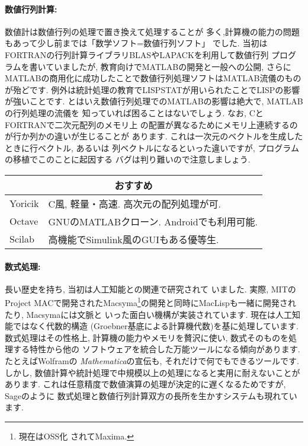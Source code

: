 \documentclass[b5j,8pt,twocolumn]{ltjsarticle}
\begin{document}
\paragraph{数値行列計算:} 数値計は数値行列の処理で置き換えて処理することが
多く,計算機の能力の問題もあって少し前までは「数学ソフト=数値行列ソフト」
でした. 当初はFORTRANの行列計算ライブラリBLASやLAPACKを利用して数値行列
プログラムを書いていましたが, 教育向けでMATLABの開発と一般への公開, さらに
MATLABの商用化に成功したことで数値行列処理ソフトはMATLAB流儀のものが殆どです.
 例外は統計処理の教育でLISPSTATが用いられたことでLISPの影響が強いことです.
 とはいえ数値行列処理でのMATLABの影響は絶大で, MATLABの行列処理の流儀を
知っていれば困ることはないでしょう. なお, CとFORTRANで二次元配列のメモリ上
の配置が異なるためにメモリ上連続するのが行か列かの違いが生じることが
あります. これは一次元のベクトルを生成したときに行ベクトル, あるいは
列ベクトルになるといった違いですが, プログラムの移植でこのことに起因する
バグは判り難いので注意しましょう.

\vspace{0.5cm}
{\footnotesize
\begin{tabularx}{7cm}{l X}
\multicolumn{2}{c}{おすすめ}\\\hline
Yoricik& C風, 軽量・高速. 高次元の配列処理が可.\\
Octave& GNUのMATLABクローン. Androidでも利用可能.\\
Scilab& 高機能でSimulink風のGUIもある優等生.\\\hline
\end{tabularx}
}
\vspace{0.5cm}

\paragraph{数式処理:} 長い歴史を持ち, 当初は人工知能との関連で研究されて
いました. 実際, MITのProject MACで開発されたMacsyma\footnote{現在はOSS化
されてMaxima.}の開発と同時にMacLispも一緒に開発されたり, Macsymaには文脈と
いった面白い機構が実装されています. 現在は人工知能ではなく代数的構造
(Groebner基底による計算機代数)を基に処理しています. 数式処理はその性格上,
 計算機の能力やメモリを贅沢に使い, 数式そのものを処理する特性から他の
ソフトウェアを統合した万能ツールになる傾向があります. たとえばWolframの
\textit{Mathematica}の宣伝も, それだけで何でもできるツールです. しかし,
 数値計算や統計処理で中規模以上の処理になると実用に耐えないことがあります.
 これは任意精度で数値演算の処理が決定的に遅くなるためですが, Sageのように
数式処理と数値行列計算双方の長所を生かすシステムも現れています.
\end{document}
